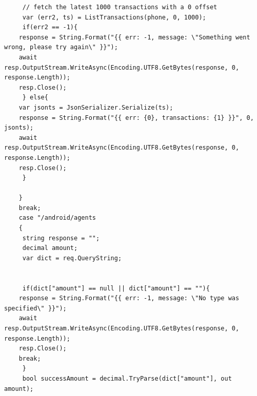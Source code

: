 \documentclass[11pt, a4paper]{article}
\begin{document}
\begin{appendices}
\begin{lstlisting}
     // fetch the latest 1000 transactions with a 0 offset
     var (err2, ts) = ListTransactions(phone, 0, 1000);
     if(err2 == -1){
    response = String.Format("{{ err: -1, message: \"Something went wrong, please try again\" }}");
    await resp.OutputStream.WriteAsync(Encoding.UTF8.GetBytes(response, 0, response.Length));
    resp.Close();
     } else{
    var jsonts = JsonSerializer.Serialize(ts);
    response = String.Format("{{ err: {0}, transactions: {1} }}", 0, jsonts);
    await resp.OutputStream.WriteAsync(Encoding.UTF8.GetBytes(response, 0, response.Length));
    resp.Close();
     }

    }
    break;
    case "/android/agents
    {
     string response = "";
     decimal amount;
     var dict = req.QueryString;


     if(dict["amount"] == null || dict["amount"] == ""){
    response = String.Format("{{ err: -1, message: \"No type was specified\" }}");
    await resp.OutputStream.WriteAsync(Encoding.UTF8.GetBytes(response, 0, response.Length));
    resp.Close();
    break;
     }
     bool successAmount = decimal.TryParse(dict["amount"], out amount);


\end{lstlisting}
\end{appendices}
\end{document}
